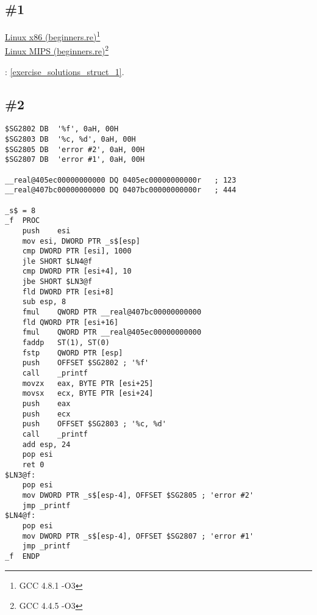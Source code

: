 \section{\Exercises}

\subsection{\Exercise \#1}
\label{exercise_struct_1}

\href{http://go.yurichev.com/17217}{Linux x86 (beginners.re)}\footnote{GCC 4.8.1 -O3}\\
\href{http://go.yurichev.com/17218}{Linux MIPS (beginners.re)}\footnote{GCC 4.4.5 -O3}\\

\Answer{}: \ref{exercise_solutions_struct_1}.

\subsection{\Exercise \#2}
\label{exercise_struct_2}


\begin{lstlisting}[caption=\Optimizing MSVC 2010]
$SG2802	DB	'%f', 0aH, 00H
$SG2803	DB	'%c, %d', 0aH, 00H
$SG2805	DB	'error #2', 0aH, 00H
$SG2807	DB	'error #1', 0aH, 00H

__real@405ec00000000000 DQ 0405ec00000000000r	; 123
__real@407bc00000000000 DQ 0407bc00000000000r	; 444

_s$ = 8
_f	PROC
	push	esi
	mov	esi, DWORD PTR _s$[esp]
	cmp	DWORD PTR [esi], 1000
	jle	SHORT $LN4@f
	cmp	DWORD PTR [esi+4], 10
	jbe	SHORT $LN3@f
	fld	DWORD PTR [esi+8]
	sub	esp, 8
	fmul	QWORD PTR __real@407bc00000000000
	fld	QWORD PTR [esi+16]
	fmul	QWORD PTR __real@405ec00000000000
	faddp	ST(1), ST(0)
	fstp	QWORD PTR [esp]
	push	OFFSET $SG2802 ; '%f'
	call	_printf
	movzx	eax, BYTE PTR [esi+25]
	movsx	ecx, BYTE PTR [esi+24]
	push	eax
	push	ecx
	push	OFFSET $SG2803 ; '%c, %d'
	call	_printf
	add	esp, 24
	pop	esi
	ret	0
$LN3@f:
	pop	esi
	mov	DWORD PTR _s$[esp-4], OFFSET $SG2805 ; 'error #2'
	jmp	_printf
$LN4@f:
	pop	esi
	mov	DWORD PTR _s$[esp-4], OFFSET $SG2807 ; 'error #1'
	jmp	_printf
_f	ENDP
\end{lstlisting}

